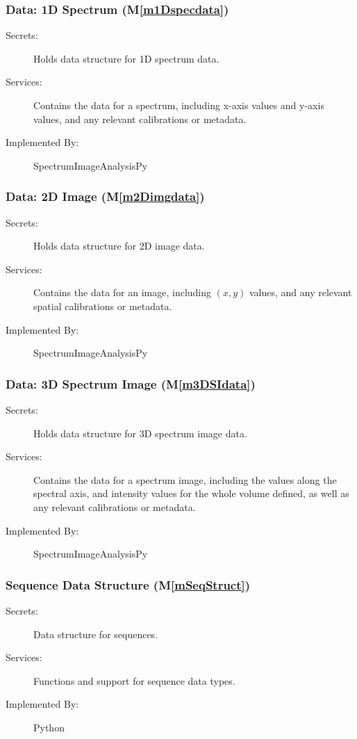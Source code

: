 \documentclass[12pt, titlepage]{article}
\newcommand{\mref}[1]{M\ref{#1}}
\newcommand{\progname}{SpectrumImageAnalysisPy}
\begin{document}
\subsubsection{Data: 1D Spectrum (\mref{m1Dspecdata})}
\label{sssec:Data1D}
\begin{description}
	\item[Secrets:]Holds data structure for 1D spectrum data.
	\item[Services:]Contains the data for a spectrum, including x-axis values and
y-axis values, and any relevant calibrations or metadata.
	\item[Implemented By:] \progname
\end{description}

\subsubsection{Data: 2D Image (\mref{m2Dimgdata})}
\label{sssec:Data2D}
\begin{description}
	\item[Secrets:]Holds data structure for 2D image data.
	\item[Services:]Contains the data for an image, including $(x,y)$ values, and
any relevant spatial calibrations or metadata.
	\item[Implemented By:] \progname
\end{description}

\subsubsection{Data: 3D Spectrum Image (\mref{m3DSIdata})}
\label{sssec:Data3D}
\begin{description}
	\item[Secrets:]Holds data structure for 3D spectrum image data.
	\item[Services:]Contains the data for a spectrum image, including the values
along the spectral axis, and intensity values for the whole volume defined, as
well as any relevant calibrations or metadata.
	\item[Implemented By:] \progname
\end{description}

\subsubsection{Sequence Data Structure (\mref{mSeqStruct})}
\label{sssec:SeqStruct}
\begin{description}
	\item[Secrets:]Data structure for sequences.
	\item[Services:]Functions and support for sequence data types.
	\item[Implemented By:] Python
\end{description}
\end{document}
